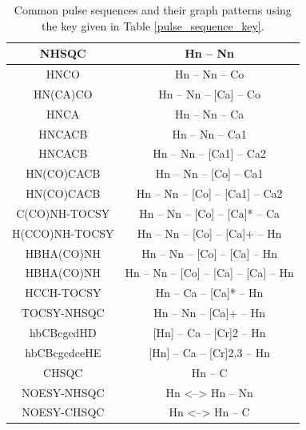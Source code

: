 \begin{table}
    \begin{tabular}{ | c | c | }
    \hline
    NHSQC           &  Hn -- Nn                                \\  \hline
    HNCO            &  Hn -- Nn -- Co                          \\  \hline
    HN(CA)CO        &  Hn -- Nn -- [Ca] -- Co                  \\  \hline
    HNCA            &  Hn -- Nn -- Ca                          \\  \hline
    HNCACB          &  Hn -- Nn -- Ca1                         \\  \hline
    HNCACB          &  Hn -- Nn -- [Ca1] -- Ca2                \\  \hline
    HN(CO)CACB      &  Hn -- Nn -- [Co] -- Ca1                 \\  \hline
    HN(CO)CACB      &  Hn -- Nn -- [Co] -- [Ca1] -- Ca2        \\  \hline
    C(CO)NH-TOCSY   &  Hn -- Nn -- [Co] -- [Ca]* -- Ca         \\  \hline
    H(CCO)NH-TOCSY  &  Hn -- Nn -- [Co] -- [Ca]+ -- Hn         \\  \hline
    HBHA(CO)NH      &  Hn -- Nn -- [Co] -- [Ca] -- Hn          \\  \hline
    HBHA(CO)NH      &  Hn -- Nn -- [Co] -- [Ca] -- [Ca] -- Hn  \\  \hline
    HCCH-TOCSY      &  Hn -- Ca -- [Ca]* -- Hn                 \\  \hline
    TOCSY-NHSQC     &  Hn -- Nn -- [Ca]+ -- Hn                 \\  \hline
    hbCBcgcdHD      &  [Hn] -- Ca -- [Cr]{2} -- Hn             \\  \hline
    hbCBcgcdceHE    &  [Hn] -- Ca -- [Cr]{2,3} -- Hn           \\  \hline  
    CHSQC           &  Hn -- C                                 \\  \hline
    NOESY-NHSQC     &  Hn <--> Hn -- Nn                        \\  \hline
    NOESY-CHSQC     &  Hn <--> Hn -- C                         \\  \hline
    \end{tabular}
    \caption{Common pulse sequences and their graph patterns using the key
             given in Table \ref{pulse_sequence_key}.}
    \label{pulse_sequence_patterns}
\end{table}


